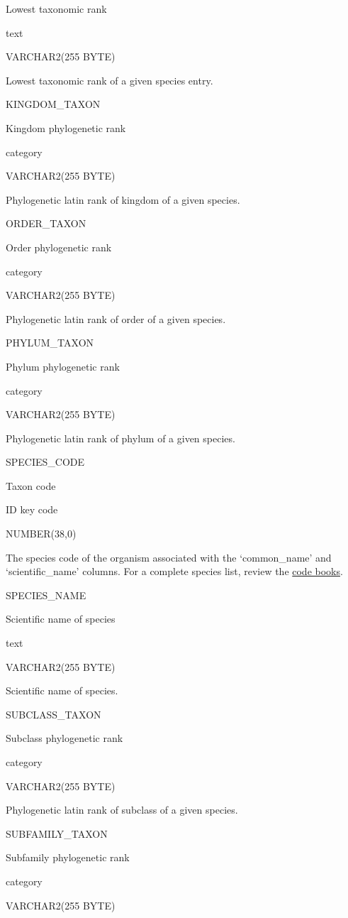 \documentclass[
  letterpaper,
  oneside,
  open=any]{scrbook}
\begin{document}
Lowest taxonomic rank

text

VARCHAR2(255 BYTE)

Lowest taxonomic rank of a given species entry.

KINGDOM\_TAXON

Kingdom phylogenetic rank

category

VARCHAR2(255 BYTE)

Phylogenetic latin rank of kingdom of a given species.

ORDER\_TAXON

Order phylogenetic rank

category

VARCHAR2(255 BYTE)

Phylogenetic latin rank of order of a given species.

PHYLUM\_TAXON

Phylum phylogenetic rank

category

VARCHAR2(255 BYTE)

Phylogenetic latin rank of phylum of a given species.

SPECIES\_CODE

Taxon code

ID key code

NUMBER(38,0)

The species code of the organism associated with the `common\_name' and
`scientific\_name' columns. For a complete species list, review the
\href{https://www.fisheries.noaa.gov/resource/document/groundfish-survey-species-code-manual-and-data-codes-manual}{code
books}.

SPECIES\_NAME

Scientific name of species

text

VARCHAR2(255 BYTE)

Scientific name of species.

SUBCLASS\_TAXON

Subclass phylogenetic rank

category

VARCHAR2(255 BYTE)

Phylogenetic latin rank of subclass of a given species.

SUBFAMILY\_TAXON

Subfamily phylogenetic rank

category

VARCHAR2(255 BYTE)
\end{document}
